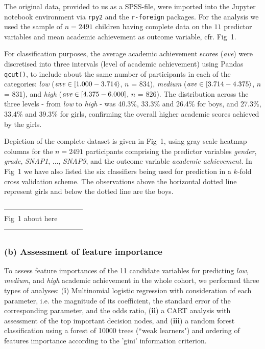 \documentclass[10pt,letterpaper]{article}
\begin{document}
The original data, provided to us as a SPSS-file, were imported into the Jupyter notebook environment via {\tt rpy2} and the {\tt r-foreign} packages. 
For the analysis we used the sample of  $n=2491$ children having complete data 
on the $11$ predictor variables and mean academic achievement as outcome variable, cfr. Fig~1.

 For classification purposes, the average academic achievement scores (\emph{ave}) were discretised into three intervals (level of academic achievement) 
 using Pandas {\tt qcut()}, to include about the same number of participants in each of the categories:  
{\it low} (${\text{\it ave}} \in [1.000 - 3.714\rangle$,  $n$ = 834),
{\it medium} (${\text{\it ave}} \in [3.714 - 4.375\rangle$, $n$ = 831), and
{\it high} (${\text{\it ave}} \in [4.375 - 6.000]$, $n$ = 826). 
The distribution across the three levels - from {\it low} to {\it high} - was 
40.3\%, 33.3\% and 26.4\% for boys, and 27.3\%, 33.4\% and 39.3\% for girls, 
confirming the overall higher academic scores achieved by the girls. 

Depiction of the complete dataset is given in Fig~1,  using gray scale heatmap columns for the $n=2491$ participants comprising 
the predictor variables {\it gender}, {\it grade}, 
{\it SNAP1}, ..., {\it SNAP9}, and the outcome variable {\it academic achievement}. In Fig~1 we have also listed the
 six classifiers being used for prediction in a $k$-fold cross validation scheme. The observations above the horizontal dotted line represent girls and below the dotted line are the boys.

 \vspace{3mm}
 
 \begin{center}
 ---------------------------------\\
 
 Fig~1 about here \\
 
  ---------------------------------\\
  \end{center}
  
  \vspace{3mm}
  
 
 \subsubsection*{(b) Assessment of feature importance} 
  To assess feature importances of the 11 candidate variables for predicting {\it low}, {\it medium}, and {\it high} academic achievement in the whole cohort,
 we performed three types of analyses: ({\bf i}) Multinomial logistic regression with consideration of each parameter, i.e. the magnitude of its coefficient, the standard error of the corresponding parameter, and the odds ratio, 
 ({\bf ii}) a CART analysis with assessment 
 of the top important decision nodes, and ({\bf iii}) a random forest classification using a forest of 10000 trees (``weak learners") and ordering of features importance according
  to the 'gini' information criterion. 
 
\end{document}
